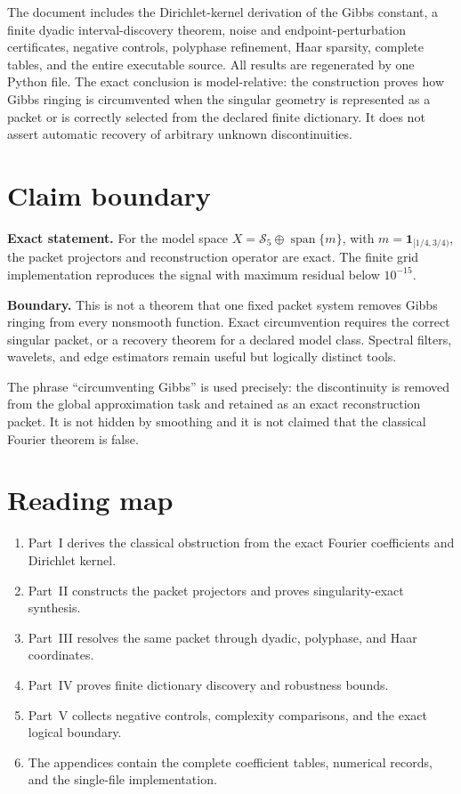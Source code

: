 \documentclass[11pt,oneside]{book}
\theoremstyle{remark}\newtheorem{remark}[theorem]{Remark}\newtheorem{boundary}[theorem]{Boundary}\newtheorem{certificate}[theorem]{Certificate}
\newcommand{\ExactBox}[1]{\noindent\colorbox{PaleTeal}{\parbox{0.955\linewidth}{\small\textbf{Exact statement.} #1}}}
\newcommand{\BoundaryBox}[1]{\noindent\colorbox{PaleOrange}{\parbox{0.955\linewidth}{\small\textbf{Boundary.} #1}}}
\begin{document}
The document includes the Dirichlet-kernel derivation of the Gibbs constant, a finite dyadic interval-discovery theorem, noise and endpoint-perturbation certificates, negative controls, polyphase refinement, Haar sparsity, complete tables, and the entire executable source.  All results are regenerated by one Python file.  The exact conclusion is model-relative: the construction proves how Gibbs ringing is circumvented when the singular geometry is represented as a packet or is correctly selected from the declared finite dictionary.  It does not assert automatic recovery of arbitrary unknown discontinuities.

\chapter*{Claim boundary}
\ExactBox{For the model space $X=\mathcal S_5\oplus\operatorname{span}\{m\}$, with $m=\mathbf1_{[1/4,3/4)}$, the packet projectors and reconstruction operator are exact.  The finite grid implementation reproduces the signal with maximum residual below $10^{-15}$.}

\BoundaryBox{This is not a theorem that one fixed packet system removes Gibbs ringing from every nonsmooth function.  Exact circumvention requires the correct singular packet, or a recovery theorem for a declared model class.  Spectral filters, wavelets, and edge estimators remain useful but logically distinct tools.}

The phrase ``circumventing Gibbs'' is used precisely: the discontinuity is removed from the global approximation task and retained as an exact reconstruction packet.  It is not hidden by smoothing and it is not claimed that the classical Fourier theorem is false.

\chapter*{Reading map}
\begin{enumerate}
\item Part~I derives the classical obstruction from the exact Fourier coefficients and Dirichlet kernel.
\item Part~II constructs the packet projectors and proves singularity-exact synthesis.
\item Part~III resolves the same packet through dyadic, polyphase, and Haar coordinates.
\item Part~IV proves finite dictionary discovery and robustness bounds.
\item Part~V collects negative controls, complexity comparisons, and the exact logical boundary.
\item The appendices contain the complete coefficient tables, numerical records, and the single-file implementation.
\end{enumerate}
\tableofcontents
\mainmatter
\end{document}
